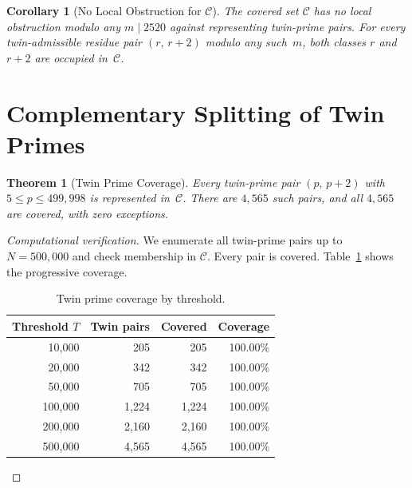 \documentclass[12pt,a4paper]{article}
\newtheorem{theorem}{Theorem}
\newtheorem{corollary}{Corollary}
\theoremstyle{remark}
\begin{document}
\begin{corollary}[No Local Obstruction for $\mathcal{C}$]
\label{cor:nolocal}
The covered set $\mathcal{C}$ has no local obstruction modulo any
$m \mid 2520$ against representing twin-prime pairs. For every
twin-admissible residue pair $(r,\,r{+}2)$ modulo any such~$m$, both
classes $r$ and $r{+}2$ are occupied in~$\mathcal{C}$.
\end{corollary}

\section{Complementary Splitting of Twin Primes}

\begin{theorem}[Twin Prime Coverage]
\label{thm:coverage}
Every twin-prime pair $(p,\,p{+}2)$ with $5 \leq p \leq 499{,}998$ is
represented in~$\mathcal{C}$.  There are $4{,}565$ such pairs, and all
$4{,}565$ are covered, with zero exceptions.
\end{theorem}

\begin{proof}[Computational verification]
We enumerate all twin-prime pairs up to $N = 500{,}000$ and check
membership in $\mathcal{C}$.  Every pair is covered.
Table~\ref{tab:coverage} shows the progressive coverage.

\begin{table}[h]
\centering
\caption{Twin prime coverage by threshold.}
\label{tab:coverage}
\begin{tabular}{rrrr}
\toprule
\textbf{Threshold $T$} & \textbf{Twin pairs} & \textbf{Covered} & \textbf{Coverage} \\
\midrule
10{,}000 & 205 & 205 & 100.00\% \\
20{,}000 & 342 & 342 & 100.00\% \\
50{,}000 & 705 & 705 & 100.00\% \\
100{,}000 & 1{,}224 & 1{,}224 & 100.00\% \\
200{,}000 & 2{,}160 & 2{,}160 & 100.00\% \\
500{,}000 & 4{,}565 & 4{,}565 & 100.00\% \\
\bottomrule
\end{tabular}
\end{table}
\end{proof}
\end{document}
